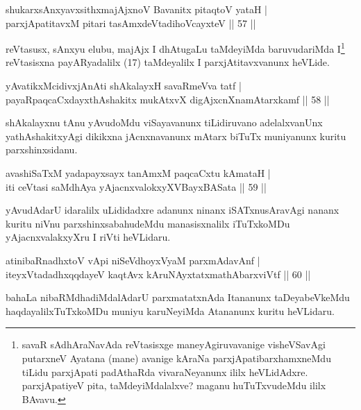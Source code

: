 \begin{shl}
shukarxsAnxyavxsithxmajAjxnoV Bavanitx pitaqtoV yataH |\\
parxjApatitavxM pitari tasAmxdeVtadihoVcayxteV \hfill || 57 ||
\end{shl}

\begin{artha}%
reVtasusx, sAnxyu elubu, majAjx I dhAtugaLu taMdeyiMda baruvudariMda I\footnote[1]{savaR sAdhAraNavAda reVtasisxge maneyAgiruvavanige visheVSavAgi putarxneV Ayatana (mane) avanige kAraNa parxjApatibarxhamxneMdu tiLidu parxjApati padAthaRda vivaraNeyanunx ililx heVLidAdxre. parxjApatiyeV pita, taMdeyiMdalalxve? maganu huTuTxvudeMdu ililx BAvavu.} reVtasisxna payARyadalilx (17) taMdeyalilx I parxjAtitavxvanunx heVLide.
\end{artha}

\begin{shl}
yAvatikxMcidivxjAnAti shAkalayxH savaRmeVva tatf |\\
payaRpaqcaCxdayxthAshakitx mukAtxvX digAjxcnXnamAtarxkamf \hfill || 58 ||
\end{shl}

\begin{artha}
shAkalayxnu tAnu yAvudoMdu viSayavanunx tiLidiruvano adelalxvanUnx yathAshakitxyAgi dikikxna jAcnxnavanunx mAtarx biTuTx muniyanunx kuritu parxshinxsidanu.
\end{artha}

\begin{shl}
avashiSaTxM yadapayxsayx tanAmxM paqcaCxtu kAmataH |\\
iti ceVtasi saMdhAya yAjacnxvalokxyXV\s BayxBASata \hfill || 59 ||
\end{shl}

\begin{artha}
yAvudAdarU idaralilx uLididadxre adanunx ninanx iSATxnusAravAgi nananx kuritu niVnu parxshinxsabahudeMdu manasisxnalilx iTuTxkoMDu yAjacnxvalakxyXru I riVti heVLidaru.
\end{artha}

\begin{shl}
atinibaRnadhxtoV vA\s pi niSeVdhoyxV\s yaM parxmAdavAnf |\\
iteyxVtadadhxqqdayeV kaqtAvx kAruNAyxtatxmathAbarxviVtf \hfill || 60 ||
\end{shl}

\begin{artha}
bahaLa nibaRMdhadiMdalAdarU parxmatatxnAda Itananunx taDeyabeVkeMdu haqdayalilxTuTxkoMDu muniyu karuNeyiMda Atananunx kuritu heVLidaru.
\end{artha}%

